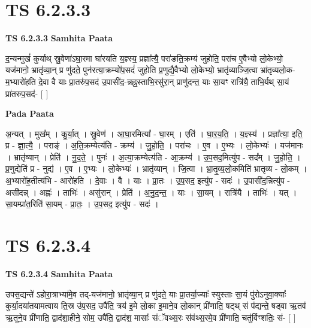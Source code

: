 \documentclass[17pt]{extarticle}
\begin{document}
\section*{ TS 6.2.3.3 }

\textbf{TS 6.2.3.3 } \newline
\textbf{Samhita Paata} \newline

द॒न्यन्मुखं॑ कुर्याथ् स्रु॒वेणा॑ऽघा॒रमा घा॑रयति य॒ज्ञ्स्य॒ प्रज्ञा᳚त्यै॒ परा॑ङति॒क्रम्य॑ जुहोति॒ परा॑च ए॒वैभ्यो लो॒केभ्यो॒ यज॑मानो॒ भ्रातृ॑व्या॒न् प्र णु॑दते॒ पुन॑रत्या॒क्रम्यो॑प॒सदं॑ जुहोति प्र॒णुद्यै॒वैभ्यो लो॒केभ्यो॒ भ्रातृ॑व्याञ्जि॒त्वा भ्रा॑तृव्यलो॒क-म॒भ्यारो॑हति दे॒वा वै याः प्रा॒तरु॑प॒सद॑ उ॒पासी॑द॒-न्नह्न॒स्ताभि॒रसु॑रा॒न् प्राणु॑दन्त॒ याः सा॒यꣳ रात्रि॑यै॒ ताभि॒र्यथ् सा॒यं प्रा॑तरुप॒सद॑- [  ] \newline

\textbf{Pada Paata} \newline

अ॒न्यत् । मुख᳚म् । कु॒र्या॒त् । स्रु॒वेण॑ । आ॒घा॒रमित्या᳚ - घा॒रम् । एति॑ । घा॒र॒य॒ति॒ । य॒ज्ञ्स्य॑ । प्रज्ञा᳚त्या॒ इति॒ प्र - ज्ञा॒त्यै॒ । पराङ्॑ । अ॒ति॒क्रम्येत्य॑ति - क्रम्य॑ । जु॒हो॒ति॒ । परा॑चः । ए॒व । ए॒भ्यः । लो॒केभ्यः॑ । यज॑मानः । भ्रातृ॑व्यान् । प्रेति॑ । नु॒द॒ते॒ । पुनः॑ । अ॒त्या॒क्रम्येत्य॑ति - आ॒क्रम्य॑ । उ॒प॒सद॒मित्यु॑प - सद᳚म् । जु॒हो॒ति॒ । प्र॒णुद्येति॑ प्र - नुद्य॑ । ए॒व । ए॒भ्यः । लो॒केभ्यः॑ । भ्रातृ॑व्यान् । जि॒त्वा । भ्रा॒तृ॒व्य॒लो॒कमिति॑ भ्रातृव्य - लो॒कम् । अ॒भ्यारो॑ह॒तीत्य॑भि - आरो॑हति । दे॒वाः । वै । याः । प्रा॒तः । उ॒प॒सद॒ इत्यु॑प - सदः॑ । उ॒पासी॑द॒न्नित्यु॑प - असी॑दन्न् । अह्नः॑ । ताभिः॑ । असु॑रान् । प्रेति॑ । अ॒नु॒द॒न्त॒ । याः । सा॒यम् । रात्रि॑यै । ताभिः॑ । यत् । सा॒यम्प्रा॑त॒रिति॑ सा॒यम् - प्रा॒तः॒ । उ॒प॒सद॒ इत्यु॑प - सदः॑ ।  \newline




\section*{ TS 6.2.3.4 }

\textbf{TS 6.2.3.4 } \newline
\textbf{Samhita Paata} \newline

उपस॒द्यन्ते॑ ऽहोरा॒त्राभ्या॑मे॒व तद्-यज॑मानो॒ भ्रातृ॑व्या॒न् प्र णु॑दते॒ याः प्रा॒तर्या॒ज्याः᳚ स्युस्ताः सा॒यं पु॑रोऽनुवा॒क्याः᳚ कुर्या॒दया॑तयामत्वाय ति॒स्र उ॑प॒सद॒ उपै॑ति॒ त्रय॑ इ॒मे लो॒का इ॒माने॒व लो॒कान् प्री॑णाति॒ षट्थ् सं प॑द्यन्ते॒ षड्वा ऋ॒तव॑ ऋ॒तूने॒व प्री॑णाति॒ द्वाद॑शा॒हीने॒ सोम॒ उपै॑ति॒ द्वाद॑श॒ मासाः᳚ संॅवथ्स॒रः स॑वंथ्स॒रमे॒व प्री॑णाति॒ चतु॑र्विꣳशतिः॒ सं- [  ] \newline
\end{document}

